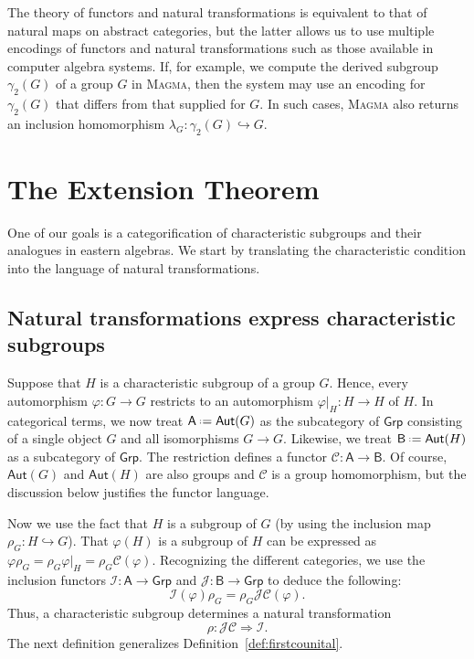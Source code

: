\documentclass{amsart}
\newcommand{\Cat}[1]{\mathsf{#1}}
\newcommand{\cat}[1]{\Cat{#1}}
\newcommand{\acat}[1]{\mathsf{#1}}
\numberwithin{lstfloat}{section}
\newcommand{\defeq}{\mathrel{\hstretch{.13}{=}\hspace{.2ex}{=}}}
\newcommand{\Autcat}{\cat{Aut}}
\newcommand{\func}[1]{\mathcal{#1}}
\newcommand{\fC}{\func{C}}
\newcommand{\fI}{\func{I}}
\newcommand{\fJ}{\func{J}}
\theoremstyle{definition}
\theoremstyle{remark}
\numberwithin{equation}{section}
\begin{document}
The theory of functors and natural transformations is equivalent to that of natural maps on
abstract categories, but the latter allows us to
use multiple encodings of functors and natural transformations such as those
available in computer algebra systems. If, for example, we compute the 
derived subgroup
$\gamma_2(G)$ of a group $G$ in \textsc{Magma}, then the system may use an
encoding for $\gamma_2(G)$ that differs from 
that supplied for $G$. In such cases, \textsc{Magma} also returns 
an inclusion homomorphism
$\lambda_G : \gamma_2(G)\hookrightarrow G$. 


\section{The Extension Theorem}
\label{sec:induced}   

One of our goals is a categorification of characteristic subgroups and their analogues
 in eastern algebras. We start by translating the characteristic condition into
 the language of natural transformations. 

\subsection{Natural transformations express characteristic subgroups}
\label{sec:nat-trans-express}

Suppose that $H$ is a characteristic subgroup of a group $G$.   
Hence, every automorphism $\varphi:G\to G$ restricts to an 
automorphism $\varphi|_H:H\to H$ of $H$.  In categorical terms, 
we now treat $\acat{A}\defeq \Autcat(G)$ as the subcategory of 
$\cat{Grp}$ consisting of a single
object $G$ and all isomorphisms $G\to G$.  Likewise, we treat $\acat{B}\defeq
\Autcat(H)$ as a subcategory of $\cat{Grp}$.  The restriction defines a
functor $\fC:\acat{A}\to \acat{B}$.  
Of course, $\Autcat(G)$ and $\Autcat(H)$ are also groups
and $\fC$ is a group homomorphism, but the discussion below 
justifies the functor language.  

Now we use the fact that $H$ is a subgroup of $G$ (by using the inclusion map
$\rho_G:H\hookrightarrow G$).  
That $\varphi(H)$ is a subgroup of $H$ can be expressed as 
\(
  \varphi\rho_G=\rho_G\varphi|_H=\rho_G\fC(\varphi).
\)  
Recognizing the different categories, we use 
the inclusion functors $\fI:\acat{A}\to \acat{Grp}$ 
and $\fJ:\acat{B}\to \acat{Grp}$ to deduce the following:
\begin{equation*} 
  \fI(\varphi)\rho_G=\rho_G\fJ\fC(\varphi).
\end{equation*}
Thus, a characteristic subgroup determines a natural transformation
\[
  \rho:\fJ\fC\Rightarrow \fI.
\]
The next definition generalizes Definition~\ref{def:firstcounital}.
\end{document}
